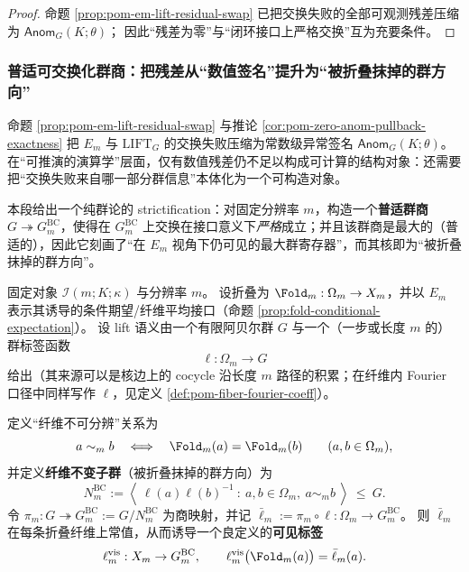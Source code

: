 \begin{proof}
命题 \ref{prop:pom-em-lift-residual-swap} 已把交换失败的全部可观测残差压缩为 \(\mathsf{Anom}_G(K;\theta)\)；
因此“残差为零”与“闭环接口上严格交换”互为充要条件。
\end{proof}

\subsubsection{普适可交换化群商：把残差从“数值签名”提升为“被折叠抹掉的群方向”}\label{subsec:pom-bc-quotient}
命题 \ref{prop:pom-em-lift-residual-swap} 与推论 \ref{cor:pom-zero-anom-pullback-exactness} 把 \(E_m\) 与 \(\mathrm{LIFT}_G\) 的交换失败压缩为常数级异常签名 \(\mathsf{Anom}_G(K;\theta)\)。
在“可推演的演算学”层面，仅有数值残差仍不足以构成可计算的结构对象：还需要把“交换失败来自哪一部分群信息”本体化为一个可构造对象。
\par
本段给出一个纯群论的 strictification：对固定分辨率 \(m\)，构造一个\textbf{普适群商} \(G\twoheadrightarrow G^{\mathrm{BC}}_m\)，使得在 \(G^{\mathrm{BC}}_m\) 上交换在接口意义下\emph{严格}成立；并且该群商是最大的（普适的），因此它刻画了“在 \(E_m\) 视角下仍可见的最大群寄存器”，而其核即为“被折叠抹掉的群方向”。

\begin{definition}\label{def:pom-bc-quotient}
固定对象 \(\mathcal{I}(m;K;\kappa)\) 与分辨率 \(m\)。
设折叠为 \(\Fold_m:\Omega_m\to X_m\)，并以 \(E_m\) 表示其诱导的条件期望/纤维平均接口（命题 \ref{prop:fold-conditional-expectation}）。
设 lift 语义由一个有限阿贝尔群 \(G\) 与一个（一步或长度 \(m\) 的）群标签函数
\[
\ell:\Omega_m\to G
\]
给出（其来源可以是核边上的 cocycle 沿长度 \(m\) 路径的积累；在纤维内 Fourier 口径中同样写作 \(\ell\)，见定义 \ref{def:pom-fiber-fourier-coeff}）。
\par
定义“纤维不可分辨”关系为
\[
a\sim_m b\quad\Longleftrightarrow\quad \Fold_m(a)=\Fold_m(b)\qquad(a,b\in\Omega_m),
\]
并定义\textbf{纤维不变子群}（被折叠抹掉的群方向）为
\[
N^{\mathrm{BC}}_m
:=\left\langle\ \ell(a)\ell(b)^{-1}\ :\ a,b\in\Omega_m,\ a\sim_m b\ \right\rangle\ \le\ G.
\]
令 \(\pi_m:G\twoheadrightarrow G^{\mathrm{BC}}_m:=G/N^{\mathrm{BC}}_m\) 为商映射，并记 \(\bar\ell_m:=\pi_m\circ \ell:\Omega_m\to G^{\mathrm{BC}}_m\)。
则 \(\bar\ell_m\) 在每条折叠纤维上常值，从而诱导一个良定义的\textbf{可见标签}
\[
\ell^{\mathrm{vis}}_m:X_m\to G^{\mathrm{BC}}_m,
\qquad
\ell^{\mathrm{vis}}_m\bigl(\Fold_m(a)\bigr)=\bar\ell_m(a).
\]
\end{definition}

